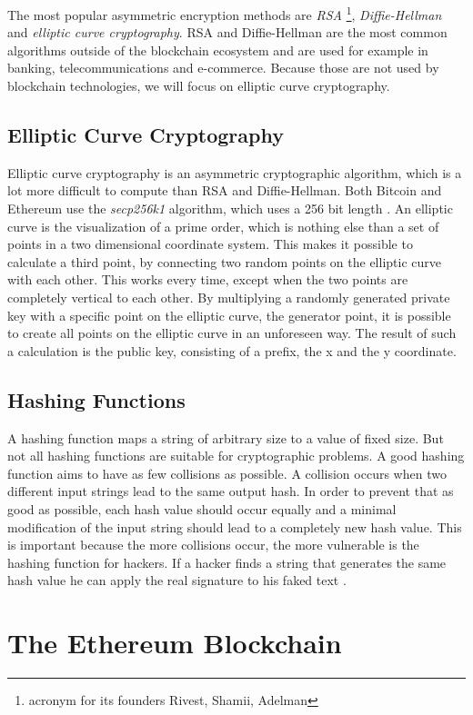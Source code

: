 The most popular asymmetric encryption methods are \textit{RSA} \footnote{acronym for its founders Rivest, Shamii, Adelman}, \textit{Diffie-Hellman} and \textit{elliptic curve cryptography}. RSA and Diffie-Hellman are the most common algorithms outside of the blockchain ecosystem and are used for example in banking, telecommunications and e-commerce. Because those are not used by blockchain technologies, we will focus on elliptic curve cryptography.
\subsection{Elliptic Curve Cryptography}
Elliptic curve cryptography is an asymmetric cryptographic algorithm, which is a lot more difficult to compute than RSA and Diffie-Hellman. Both Bitcoin and
Ethereum use the \textit{secp256k1} algorithm, which uses a 256 bit length \cite{secp256k1}. An elliptic curve is the visualization of a prime order, which is nothing else than a set of
points in a two dimensional coordinate system. This makes it possible to calculate a third point, by connecting two random points on the elliptic
curve with each other. This works every time, except when the two points are completely vertical to each other. By multiplying a randomly generated private key
with a specific point on the elliptic curve, the generator point, it is possible to create all points on the elliptic curve in an unforeseen way. The result of such a calculation is the public key, consisting of a prefix, the x and the y coordinate.

\subsection{Hashing Functions}
A hashing function maps a string of arbitrary size to a value of fixed size. But not all hashing functions are suitable for cryptographic problems. 
A good hashing function aims to have as few collisions as possible. A collision occurs when two different input strings lead to the same output hash.
In order to prevent that as good as possible, each hash value should occur equally and a minimal modification of the input string should lead to a
completely new hash value. This is important because the more collisions occur, the more vulnerable is the hashing function for hackers. If a hacker
finds a string that generates the same hash value he can apply the real signature to his faked text \cite[pp. 200-201]{Schmeh2007}.

\section{The Ethereum Blockchain}
